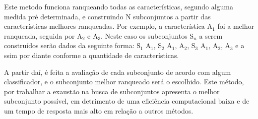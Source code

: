         Este metodo funciona ranqueando todas as características, segundo alguma medida pré determinada, e construindo N subconjuntos a partir das características melhores ranqueadas. Por exemplo, a característica A$_1$ foi a melhor ranqueada, seguida por A$_2$ e A$_3$. Neste caso os subconjuntos S$_n$ a serem construídos serão dados da seguinte forma: S$_1$ {A$_1$}, S$_2$ {A$_1$, A$_2$}, S$_3$ {A$_1$, A$_2$, A$_3$} e a ssim por diante conforme a quantidade de características.

        A partir daí, é feita a avaliação de cada subconjunto de acordo com algum classificador, e o subconjunto melhor ranqueado será o escolhido. Este método, por trabalhar a exaustão na busca de subconjuntos apresenta o melhor subconjunto possível, em detrimento de uma eficiência computacional baixa e de um tempo de resposta mais alto em relação a outros métodos.\cite{Franco2015}